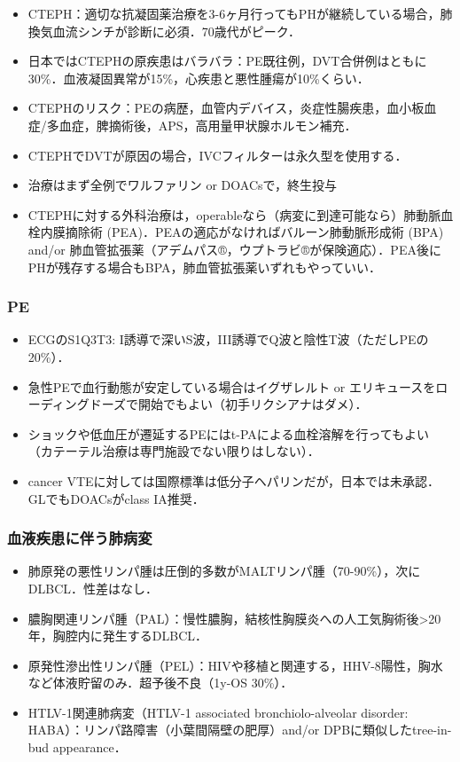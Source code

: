 \begin{itemize}
\item CTEPH：適切な抗凝固薬治療を3-6ヶ月行ってもPHが継続している場合，肺換気血流シンチが診断に必須．70歳代がピーク．
\item 日本ではCTEPHの原疾患はバラバラ：PE既往例，DVT合併例はともに30\%．血液凝固異常が15\%，心疾患と悪性腫瘍が10\%くらい．
\item CTEPHのリスク：PEの病歴，血管内デバイス，炎症性腸疾患，血小板血症/多血症，脾摘術後，APS，高用量甲状腺ホルモン補充．
\item CTEPHでDVTが原因の場合，IVCフィルターは永久型を使用する．
\item 治療はまず全例でワルファリン or DOACsで，終生投与
\item CTEPHに対する外科治療は，operableなら（病変に到達可能なら）肺動脈血栓内膜摘除術 (PEA)．PEAの適応がなければバルーン肺動脈形成術 (BPA) and/or 肺血管拡張薬（アデムパス®，ウプトラビ®が保険適応）．PEA後にPHが残存する場合もBPA，肺血管拡張薬いずれもやっていい．

\end{itemize}


\subsubsection{PE}

\begin{itemize}
\item ECGのS1Q3T3: I誘導で深いS波，III誘導でQ波と陰性T波（ただしPEの20\%）．
\item 急性PEで血行動態が安定している場合はイグザレルト or エリキュースをローディングドーズで開始でもよい（初手リクシアナはダメ）．
\item ショックや低血圧が遷延するPEにはt-PAによる血栓溶解を行ってもよい（カテーテル治療は専門施設でない限りはしない）．
\item cancer VTEに対しては国際標準は低分子ヘパリンだが，日本では未承認．GLでもDOACsがclass IA推奨．
\end{itemize}


\subsubsection{血液疾患に伴う肺病変}

\begin{itemize}
\item 肺原発の悪性リンパ腫は圧倒的多数がMALTリンパ腫（70-90\%），次にDLBCL．性差はなし．
\item 膿胸関連リンパ腫（PAL）：慢性膿胸，結核性胸膜炎への人工気胸術後>20年，胸腔内に発生するDLBCL．
\item 原発性滲出性リンパ腫（PEL）：HIVや移植と関連する，HHV-8陽性，胸水など体液貯留のみ．超予後不良（1y-OS 30\%）．
\item HTLV-1関連肺病変（HTLV-1 associated bronchiolo-alveolar disorder: HABA）：リンパ路障害（小葉間隔壁の肥厚）and/or DPBに類似したtree-in-bud appearance．

\end{itemize}



